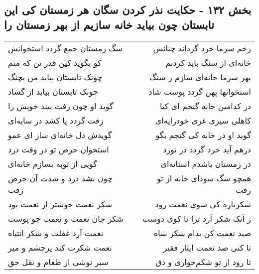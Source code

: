 \begin{center}
\section*{بخش ۱۳۲ - حکایت نذر کردن سگان هر زمستان کی این تابستان چون بیاید خانه سازیم از بهر زمستان را}
\label{sec:sh132}
\begin{longtable}{l p{0.5cm} r}
سگ زمستان جمع گردد استخوانش
&&
زخم سرما خرد گرداند چنانش
\\
کو بگوید کین قدر تن که منم
&&
خانه‌ای از سنگ باید کردنم
\\
چونک تابستان بیاید من بچنگ
&&
بهر سرما خانه‌ای سازم ز سنگ
\\
چونک تابستان بیاید از گشاد
&&
استخوانها پهن گردد پوست شاد
\\
گوید او چون زفت بیند خویش را
&&
در کدامین خانه گنجم ای کیا
\\
زفت گردد پا کشد در سایه‌ای
&&
کاهلی سیری غری خودرایه‌ای
\\
گویدش دل خانه‌ای ساز ای عمو
&&
گوید او در خانه کی گنجم بگو
\\
استخوان حرص تو در وقت درد
&&
درهم آید خرد گردد در نورد
\\
گویی از توبه بسازم خانه‌ای
&&
در زمستان باشدم استانه‌ای
\\
چون بشد درد و شدت آن حرص زفت
&&
همچو سگ سودای خانه از تو رفت
\\
شکر نعمت خوشتر از نعمت بود
&&
شکرباره کی سوی نعمت رود
\\
شکر جان نعمت و نعمت چو پوست
&&
ز آنک شکر آرد ترا تا کوی دوست
\\
نعمت آرد غفلت و شکر انتباه
&&
صید نعمت کن بدام شکر شاه
\\
نعمت شکرت کند پرچشم و میر
&&
تا کنی صد نعمت ایثار فقیر
\\
سیر نوشی از طعام و نقل حق
&&
تا رود از تو شکم‌خواری و دق
\\
\end{longtable}
\end{center}

